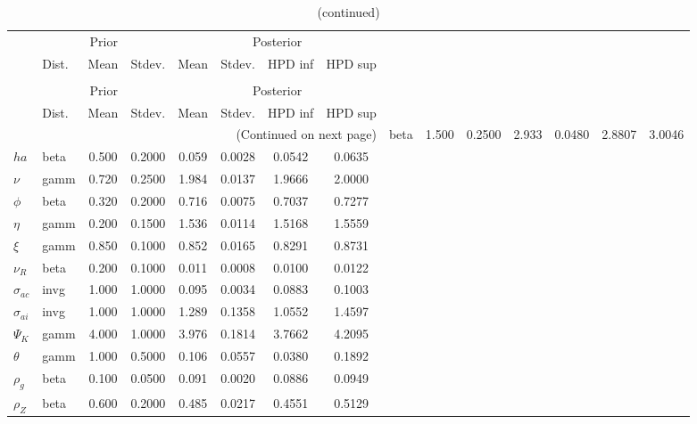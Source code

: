  
\begin{center}
\begin{longtable}{llcccccc} 
\caption{Results from Metropolis-Hastings (parameters)}
 \label{Table:MHPosterior:1}\\
\toprule 
  & \multicolumn{3}{c}{Prior}  &  \multicolumn{4}{c}{Posterior} \\
  \cmidrule(r{.75em}){2-4} \cmidrule(r{.75em}){5-8}
  & Dist. & Mean  & Stdev. & Mean & Stdev. & HPD inf & HPD sup\\
\midrule \endfirsthead 
\caption{(continued)}\\\toprule 
  & \multicolumn{3}{c}{Prior}  &  \multicolumn{4}{c}{Posterior} \\
  \cmidrule(r{.75em}){2-4} \cmidrule(r{.75em}){5-8}
  & Dist. & Mean  & Stdev. & Mean & Stdev. & HPD inf & HPD sup\\
\midrule \endhead 
\bottomrule \multicolumn{8}{r}{(Continued on next page)} \endfoot 
\bottomrule \endlastfoot 
${\sigma}$ & beta &   1.500 & 0.2500 &   2.933& 0.0480 &  2.8807 &  3.0046 \\ 
${ha}$ & beta &   0.500 & 0.2000 &   0.059& 0.0028 &  0.0542 &  0.0635 \\ 
$\nu$ & gamm &   0.720 & 0.2500 &   1.984& 0.0137 &  1.9666 &  2.0000 \\ 
${\phi}$ & beta &   0.320 & 0.2000 &   0.716& 0.0075 &  0.7037 &  0.7277 \\ 
${\eta}$ & gamm &   0.200 & 0.1500 &   1.536& 0.0114 &  1.5168 &  1.5559 \\ 
$\xi$ & gamm &   0.850 & 0.1000 &   0.852& 0.0165 &  0.8291 &  0.8731 \\ 
${\nu_R}$ & beta &   0.200 & 0.1000 &   0.011& 0.0008 &  0.0100 &  0.0122 \\ 
${\sigma_{ac}}$ & invg &   1.000 & 1.0000 &   0.095& 0.0034 &  0.0883 &  0.1003 \\ 
${\sigma_{ai}}$ & invg &   1.000 & 1.0000 &   1.289& 0.1358 &  1.0552 &  1.4597 \\ 
${\Psi_{K}}$ & gamm &   4.000 & 1.0000 &   3.976& 0.1814 &  3.7662 &  4.2095 \\ 
${\theta}$ & gamm &   1.000 & 0.5000 &   0.106& 0.0557 &  0.0380 &  0.1892 \\ 
${\rho_g}$ & beta &   0.100 & 0.0500 &   0.091& 0.0020 &  0.0886 &  0.0949 \\ 
${\rho_Z}$ & beta &   0.600 & 0.2000 &   0.485& 0.0217 &  0.4551 &  0.5129 \\ 

\end{longtable}
\end{center}
